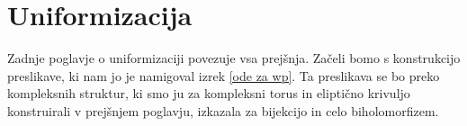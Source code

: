 \documentclass[mat1]{fmfdelo}
\numberwithin{equation}{section}
\newcommand{\C}{\mathbb C}
\newcommand{\CM}{\mathbb C ^*}
\newcommand{\htp}{\simeq}
\newcommand{\olsi}[1]{\,\overline{\!{#1}}} %
\newcommand{\kom}[1]{
    \underline{//#1}
}
\theoremstyle{definition}
\begin{document}









\section{Uniformizacija} \label{poglavje izomorfizem}

Zadnje poglavje o uniformizaciji povezuje vsa prejšnja. Začeli bomo s konstrukcijo preslikave, ki nam jo je namigoval izrek \ref{ode za wp}. Ta preslikava se bo preko kompleksnih struktur, ki smo ju za kompleksni torus in eliptično krivuljo konstruirali v prejšnjem poglavju, izkazala za bijekcijo in celo biholomorfizem. 
\end{document}
